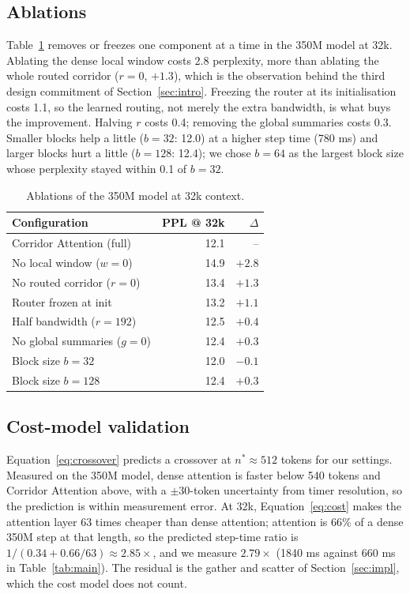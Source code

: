 \documentclass[11pt]{article}
\begin{document}
\subsection{Ablations}\label{sec:ablations}

Table~\ref{tab:ablation} removes or freezes one component at a time in the
350M model at 32k. Ablating the dense local window costs 2.8 perplexity,
more than ablating the whole routed corridor ($r = 0$, $+1.3$), which is the
observation behind the third design commitment of Section~\ref{sec:intro}.
Freezing the router at its initialisation costs 1.1, so the learned routing,
not merely the extra bandwidth, is what buys the improvement. Halving $r$
costs 0.4; removing the global summaries costs 0.3. Smaller blocks help a
little ($b = 32$: 12.0) at a higher step time (780 ms) and larger blocks
hurt a little ($b = 128$: 12.4); we chose $b = 64$ as the largest block size
whose perplexity stayed within 0.1 of $b = 32$.

\begin{table}[t]
  \centering
  \begin{tabular}{lrr}
    \toprule
    Configuration & PPL @ 32k & $\Delta$ \\
    \midrule
    Corridor Attention (full)     & 12.1 & --     \\
    No local window ($w = 0$)     & 14.9 & $+2.8$ \\
    No routed corridor ($r = 0$)  & 13.4 & $+1.3$ \\
    Router frozen at init         & 13.2 & $+1.1$ \\
    Half bandwidth ($r = 192$)    & 12.5 & $+0.4$ \\
    No global summaries ($g = 0$) & 12.4 & $+0.3$ \\
    Block size $b = 32$           & 12.0 & $-0.1$ \\
    Block size $b = 128$          & 12.4 & $+0.3$ \\
    \bottomrule
  \end{tabular}
  \caption{Ablations of the 350M model at 32k context.}
  \label{tab:ablation}
\end{table}

\subsection{Cost-model validation}\label{sec:validation}

Equation~\eqref{eq:crossover} predicts a crossover at $n^{*} \approx 512$
tokens for our settings. Measured on the 350M model, dense attention is
faster below 540 tokens and Corridor Attention above, with a $\pm 30$-token
uncertainty from timer resolution, so the prediction is within measurement
error. At 32k, Equation~\eqref{eq:cost} makes the attention layer 63 times
cheaper than dense attention; attention is 66\% of a dense 350M step at that
length, so the predicted step-time ratio is $1/(0.34 + 0.66/63) \approx
2.85\times$, and we measure $2.79\times$ (1840 ms against 660 ms in
Table~\ref{tab:main}). The residual is the gather and scatter of
Section~\ref{sec:impl}, which the cost model does not count.
\end{document}
